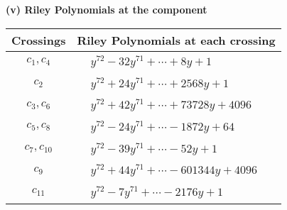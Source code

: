 \documentclass[1p]{elsarticle_modified}
\theoremstyle{definition}
\begin{document}
\flushleft \textbf{(v) Riley Polynomials at the component}\newline \\
\begin{tabular}{m{50pt}|m{274pt}}
Crossings & \hspace{64pt}Riley Polynomials at each crossing \\
\hline $$\begin{aligned}c_{1},c_{4}\end{aligned}$$&$\begin{aligned}
&y^{72}-32 y^{71}+\cdots+8 y+1
\end{aligned}$\\
\hline $$\begin{aligned}c_{2}\end{aligned}$$&$\begin{aligned}
&y^{72}+24 y^{71}+\cdots+2568 y+1
\end{aligned}$\\
\hline $$\begin{aligned}c_{3},c_{6}\end{aligned}$$&$\begin{aligned}
&y^{72}+42 y^{71}+\cdots+73728 y+4096
\end{aligned}$\\
\hline $$\begin{aligned}c_{5},c_{8}\end{aligned}$$&$\begin{aligned}
&y^{72}-24 y^{71}+\cdots-1872 y+64
\end{aligned}$\\
\hline $$\begin{aligned}c_{7},c_{10}\end{aligned}$$&$\begin{aligned}
&y^{72}-39 y^{71}+\cdots-52 y+1
\end{aligned}$\\
\hline $$\begin{aligned}c_{9}\end{aligned}$$&$\begin{aligned}
&y^{72}+44 y^{71}+\cdots-601344 y+4096
\end{aligned}$\\
\hline $$\begin{aligned}c_{11}\end{aligned}$$&$\begin{aligned}
&y^{72}-7 y^{71}+\cdots-2176 y+1
\end{aligned}$\\
\hline
\end{tabular}\\~\\
\end{document}
